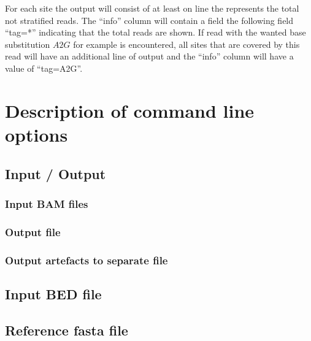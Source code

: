 \documentclass[10pt,a4paper,final]{article}
\begin{document}
For each site the output will consist of at least on line the represents the total not stratified reads.
The ``info'' column will contain a field the following field ``tag=*'' indicating that the total 
reads are shown. If read with the wanted base substitution $A2G$ for example is encountered, all sites 
that are covered by this read will have an additional line of output and the ``info'' column will have 
a value of ``tag=A2G''. 
\section{Description of command line options}
\subsection{Input / Output}
\subsubsection{Input BAM files}
\subsubsection{Output file}

\subsubsection{Output artefacts to separate file}\label{sec:separate_output}

\subsection{Input BED file}

\subsection{Reference fasta file}

\end{document}
